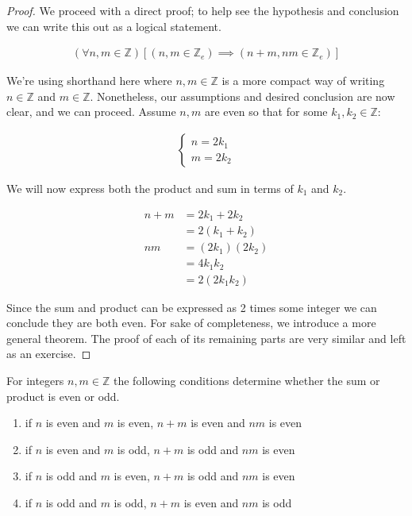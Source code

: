 \begin{proof}
	We proceed with a direct proof; to help see the hypothesis and conclusion we can write this out as a logical statement.
	
	\begin{align*}
		(\forall n, m \in \mathbb{Z})[(n, m \in \mathbb{Z}_e) \implies (n + m, nm \in \mathbb{Z}_e)]
	\end{align*}
	
	We're using shorthand here where $n, m \in \mathbb{Z}$ is a more compact way of writing $n \in \mathbb{Z}$ and $m \in \mathbb{Z}$. Nonetheless, our assumptions and desired conclusion are now clear, and we can proceed. Assume $n, m$ are even so that for some $k_1, k_2 \in \mathbb{Z}$:
	
	\begin{align*}
		\begin{cases}
			n = 2 k_1 \\
			m = 2 k_2
		\end{cases}
	\end{align*} 
	
	We will now express both the product and sum in terms of $k_1$ and $k_2$.
	
	\begin{align*}
		n + m &= 2 k_1 + 2 k_2 \\
		&= 2 (k_1 + k_2) \\
		nm &= (2 k_1)(2 k_2) \\
		&= 4 k_1 k_2 \\
		&= 2 (2 k_1 k_2)
	\end{align*}
	
	Since the sum and product can be expressed as 2 times some integer we can conclude they are both even. For sake of completeness, we introduce a more general theorem. The proof of each of its remaining parts are very similar and left as an exercise.
\end{proof}
\vspace{\baselineskip}

\begin{theorem}
	For integers $n, m \in \mathbb{Z}$ the following conditions determine whether the sum or product is even or odd.
	
	\begin{enumerate}
		\item if $n$ is even and $m$ is even, $n + m$ is even and $nm$ is even
		\item if $n$ is even and $m$ is odd, $n + m$ is odd and $nm$ is even
		\item if $n$ is odd and $m$ is even, $n + m$ is odd and $nm$ is even
		\item if $n$ is odd and $m$ is odd, $n + m$ is even and $nm$ is odd
	\end{enumerate}
\end{theorem}
\vspace{\baselineskip}

